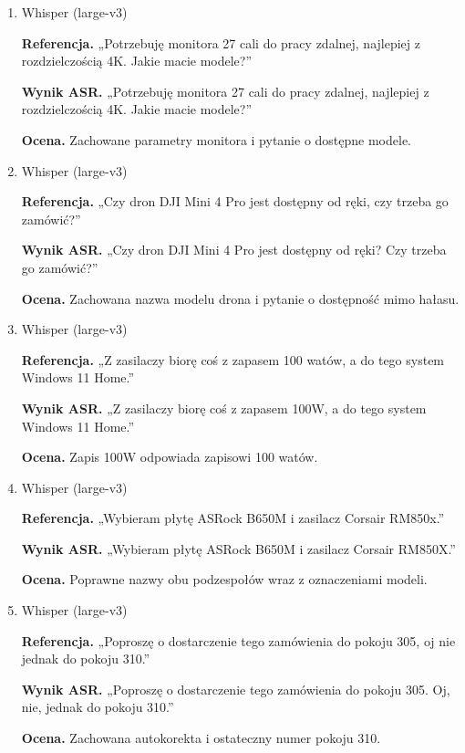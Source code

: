 \documentclass{article}
\begin{document}
\begin{enumerate}
    \item Whisper (large-v3)
    \par\textbf{Referencja.} „Potrzebuję monitora 27 cali do pracy zdalnej, najlepiej z rozdzielczością 4K. Jakie macie modele?”
    \par\textbf{Wynik ASR.} „Potrzebuję monitora 27 cali do pracy zdalnej, najlepiej z rozdzielczością 4K. Jakie macie modele?”
    \par\textbf{Ocena.} Zachowane parametry monitora i pytanie o dostępne modele.

    \item Whisper (large-v3)
    \par\textbf{Referencja.} „Czy dron DJI Mini 4 Pro jest dostępny od ręki, czy trzeba go zamówić?”
    \par\textbf{Wynik ASR.} „Czy dron DJI Mini 4 Pro jest dostępny od ręki? Czy trzeba go zamówić?”
    \par\textbf{Ocena.} Zachowana nazwa modelu drona i pytanie o dostępność mimo hałasu.

    \item Whisper (large-v3)
    \par\textbf{Referencja.} „Z zasilaczy biorę coś z zapasem 100 watów, a do tego system Windows 11 Home.”
    \par\textbf{Wynik ASR.} „Z zasilaczy biorę coś z zapasem 100W, a do tego system Windows 11 Home.”
    \par\textbf{Ocena.} Zapis 100W odpowiada zapisowi 100 watów.

    \item Whisper (large-v3)
    \par\textbf{Referencja.} „Wybieram płytę ASRock B650M i zasilacz Corsair RM850x.”
    \par\textbf{Wynik ASR.} „Wybieram płytę ASRock B650M i zasilacz Corsair RM850X.”
    \par\textbf{Ocena.} Poprawne nazwy obu podzespołów wraz z oznaczeniami modeli.

    \item Whisper (large-v3)
    \par\textbf{Referencja.} „Poproszę o dostarczenie tego zamówienia do pokoju 305, oj nie jednak do pokoju 310.”
    \par\textbf{Wynik ASR.} „Poproszę o dostarczenie tego zamówienia do pokoju 305. Oj, nie, jednak do pokoju 310.”
    \par\textbf{Ocena.} Zachowana autokorekta i ostateczny numer pokoju 310.


\end{enumerate}
\end{document}
